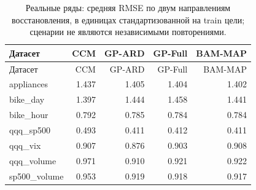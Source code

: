 \begin{longtable}{lrrrr}
\caption{Реальные ряды: средняя RMSE по двум направлениям восстановления, в единицах стандартизованной на train цели; сценарии не являются независимыми повторениями.}\label{tab:real}\\
\toprule
Датасет & CCM & GP-ARD & GP-Full & BAM-MAP \\
\midrule
\endfirsthead
\toprule
Датасет & CCM & GP-ARD & GP-Full & BAM-MAP \\
\midrule
\endhead
appliances & 1.437 & 1.405 & 1.404 & 1.402 \\
bike\_day & 1.397 & 1.444 & 1.458 & 1.441 \\
bike\_hour & 0.792 & 0.785 & 0.784 & 0.784 \\
qqq\_sp500 & 0.493 & 0.411 & 0.412 & 0.411 \\
qqq\_vix & 0.907 & 0.876 & 0.903 & 0.908 \\
qqq\_volume & 0.971 & 0.910 & 0.921 & 0.922 \\
sp500\_volume & 0.953 & 0.919 & 0.918 & 0.917 \\
\bottomrule
\end{longtable}
